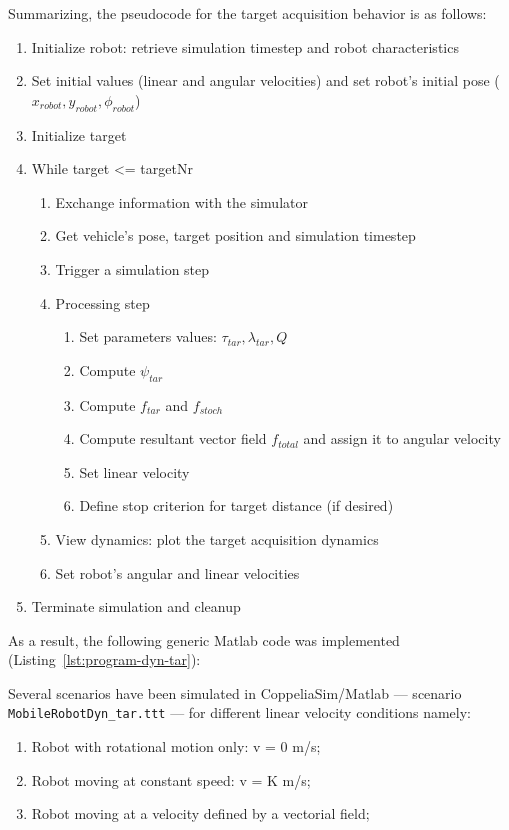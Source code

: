 Summarizing, the pseudocode for the target acquisition behavior is as follows:
\begin{enumerate}
\item Initialize robot: retrieve simulation timestep and robot characteristics
\item Set initial values (linear and angular velocities) and set robot's initial
  pose ($x_{robot}, y_{robot}, \phi_{robot}$)
\item Initialize target
\item While target <= targetNr
  \begin{enumerate}
  \item Exchange information with the simulator
  \item Get vehicle's pose, target position and simulation timestep
  \item Trigger a simulation step
  \item Processing step
    \begin{enumerate}
    \item Set parameters values: $\tau_{tar}, \lambda_{tar}, Q$
    \item Compute $\psi_{tar}$
    \item Compute $f_{tar}$ and $f_{stoch}$
    \item Compute resultant vector field $f_{total}$ and assign it to angular
      velocity
    \item Set linear velocity
    \item Define stop criterion for target distance (if desired)
    \end{enumerate}
  \item View dynamics: plot the target acquisition dynamics
  \item Set robot's angular and linear velocities
  \end{enumerate}
\item Terminate simulation and cleanup
\end{enumerate}

As a result, the following generic Matlab code was implemented (Listing~\ref{lst:program-dyn-tar}):
%

Several scenarios have been simulated in CoppeliaSim/Matlab --- scenario
\texttt{MobileRobotDyn\_tar.ttt} --- for different linear velocity conditions namely:
\begin{enumerate}
\item Robot with rotational motion only: v = 0 m/s;
\item Robot moving at constant speed: v = K m/s;
\item Robot moving at a velocity defined by a vectorial field;
\end{enumerate}
%
